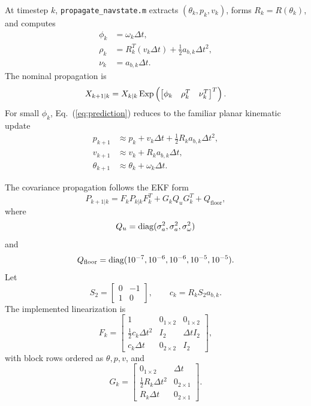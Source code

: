 At timestep \(k\), \texttt{propagate\_navstate.m} extracts \((\theta_k,p_k,v_k)\), forms \(R_k=R(\theta_k)\), and computes
\begin{align}
    \phi_k &= \omega_k \Delta t,\\
    \rho_k &= R_k^T(v_k\Delta t)+\frac{1}{2}a_{b,k}\Delta t^2,\\
    \nu_k &= a_{b,k}\Delta t.
\end{align}
The nominal propagation is
\begin{equation}
    X_{k+1|k}=X_{k|k}\operatorname{Exp}
    \left(
    \begin{bmatrix}
    \phi_k & \rho_k^T & \nu_k^T
    \end{bmatrix}^{T}
    \right).
\label{eq:prediction}
\end{equation}
For small \(\phi_k\), Eq.~(\ref{eq:prediction}) reduces to the familiar planar kinematic update 
\begin{align}
    p_{k+1} &\approx p_k+v_k\Delta t+\frac{1}{2}R_k a_{b,k}\Delta t^2, \\
    v_{k+1} &\approx v_k+R_k a_{b,k}\Delta t, \\
    \theta_{k+1} &\approx \theta_k+\omega_k\Delta t.
\end{align}

The covariance propagation follows the EKF form \citep{simon2006optimal,brownHwang2012random}
\begin{equation}
    P_{k+1|k}=F_k P_{k|k}F_k^T+G_k Q_u G_k^T+Q_{\mathrm{floor}},
\label{eq:cov_prediction}
\end{equation}
where
\begin{equation}
    Q_u=\operatorname{diag}(\sigma_a^2,\sigma_a^2,\sigma_\omega^2)
\end{equation}
and
\begin{equation}
    Q_{\mathrm{floor}}=\operatorname{diag}(10^{-7},10^{-6},10^{-6},10^{-5},10^{-5}).
\end{equation}
Let
\begin{equation}
    S_2=
    \begin{bmatrix}
    0 & -1\\
    1 & 0
    \end{bmatrix},
    \qquad
    c_k=R_k S_2 a_{b,k}.
\end{equation}
The implemented linearization is
\begin{equation}
F_k =
\begin{bmatrix}
1 & 0_{1\times 2} & 0_{1\times 2}\\
\frac{1}{2}c_k\Delta t^2 & I_2 & \Delta t I_2\\
c_k\Delta t & 0_{2\times 2} & I_2
\end{bmatrix},
\label{eq:F}
\end{equation}
with block rows ordered as \(\theta,p,v\), and
\begin{equation}
G_k =
\begin{bmatrix}
0_{1\times 2} & \Delta t\\
\frac{1}{2}R_k\Delta t^2 & 0_{2\times 1}\\
R_k\Delta t & 0_{2\times 1}
\end{bmatrix}.
\label{eq:G}
\end{equation}

